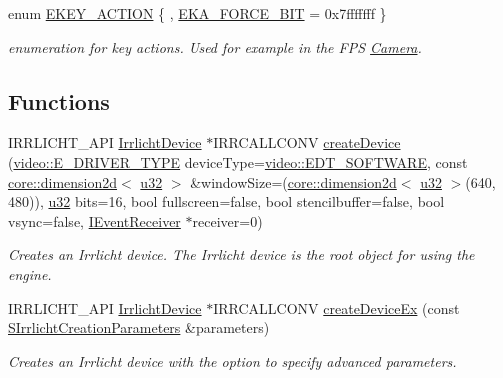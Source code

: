 \begin{DoxyCompactItemize}
\item 
enum \hyperlink{namespaceirr_aa9946ac9f3142f9e790ce52d59fd6168}{E\+K\+E\+Y\+\_\+\+A\+C\+T\+I\+ON} \{ , \hyperlink{namespaceirr_aa9946ac9f3142f9e790ce52d59fd6168a27e7067f9bc0bc5143b0bac183ca6c6b}{E\+K\+A\+\_\+\+F\+O\+R\+C\+E\+\_\+B\+IT} = 0x7fffffff
 \}\begin{DoxyCompactList}\small\item\em enumeration for key actions. Used for example in the F\+PS \hyperlink{classCamera}{Camera}. \end{DoxyCompactList}
\end{DoxyCompactItemize}
\subsection*{Functions}
\begin{DoxyCompactItemize}
\item 
I\+R\+R\+L\+I\+C\+H\+T\+\_\+\+A\+PI \hyperlink{classirr_1_1IrrlichtDevice}{Irrlicht\+Device} $\ast$I\+R\+R\+C\+A\+L\+L\+C\+O\+NV \hyperlink{namespaceirr_abaf4d8719cc26b0d30813abf85e47c76}{create\+Device} (\hyperlink{namespaceirr_1_1video_ae35a6de6d436c76107ad157fe42356d0}{video\+::\+E\+\_\+\+D\+R\+I\+V\+E\+R\+\_\+\+T\+Y\+PE} device\+Type=\hyperlink{namespaceirr_1_1video_ae35a6de6d436c76107ad157fe42356d0ad863d9225d42c1f9ea1eb7ad89a712ce}{video\+::\+E\+D\+T\+\_\+\+S\+O\+F\+T\+W\+A\+RE}, const \hyperlink{classirr_1_1core_1_1dimension2d}{core\+::dimension2d}$<$ \hyperlink{namespaceirr_a0416a53257075833e7002efd0a18e804}{u32} $>$ \&window\+Size=(\hyperlink{classirr_1_1core_1_1dimension2d}{core\+::dimension2d}$<$ \hyperlink{namespaceirr_a0416a53257075833e7002efd0a18e804}{u32} $>$(640, 480)), \hyperlink{namespaceirr_a0416a53257075833e7002efd0a18e804}{u32} bits=16, bool fullscreen=false, bool stencilbuffer=false, bool vsync=false, \hyperlink{classirr_1_1IEventReceiver}{I\+Event\+Receiver} $\ast$receiver=0)
\begin{DoxyCompactList}\small\item\em Creates an Irrlicht device. The Irrlicht device is the root object for using the engine. \end{DoxyCompactList}\item 
I\+R\+R\+L\+I\+C\+H\+T\+\_\+\+A\+PI \hyperlink{classirr_1_1IrrlichtDevice}{Irrlicht\+Device} $\ast$I\+R\+R\+C\+A\+L\+L\+C\+O\+NV \hyperlink{namespaceirr_ac83a30d674204dcb94d70f849e9b4a62}{create\+Device\+Ex} (const \hyperlink{structirr_1_1SIrrlichtCreationParameters}{S\+Irrlicht\+Creation\+Parameters} \&parameters)
\begin{DoxyCompactList}\small\item\em Creates an Irrlicht device with the option to specify advanced parameters. \end{DoxyCompactList}\end{DoxyCompactItemize}


